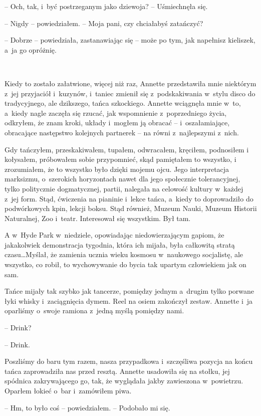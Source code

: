 \documentclass[oneside,polish,11pt,sfheadings]{mwbk}
\begin{document}
-- Och, tak, i~być postrzeganym jako dziewoja? -- Uśmiechnęła się.

-- Nigdy -- powiedziałem. -- Moja pani, czy chciałabyś zatańczyć?

-- Dobrze -- powiedziała, zastanawiając się -- może po tym, jak napełnisz
kieliszek, a~ja go opróżnię.

~

Kiedy to zostało załatwione, więcej niż raz, Annette przedstawiła mnie
niektórym z~jej przyjaciół i~kuzynów, i~taniec zmienił się z~podskakiwania w~stylu disco do tradycyjnego, ale dzikszego, tańca
szkockiego. Annette wciągnęła mnie w~to, a~kiedy nagle zaczęła się
rzucać, jak wspomnienie z~poprzedniego życia, odkryłem, że znam kroki,
układy i~mogłem ją obracać -- i~oszałamiające, obracające następstwo
kolejnych partnerek -- na równi z~najlepszymi z~nich.

Gdy tańczyłem, przeskakiwałem, tupałem, odwracałem, kręciłem, podnosiłem
i kołysałem, próbowałem sobie przypomnieć, skąd pamiętałem to wszystko,
i zrozumiałem, że to wszystko było dzięki mojemu ojcu. Jego
interpretacja marksizmu, o~szerokich horyzontach nawet dla jego
społecznie tolerancyjnej, tylko politycznie dogmatycznej, partii,
nalegała na celowość kultury w~każdej z~jej form. Stąd, ćwiczenia na
pianinie i~lekce tańca, a~kiedy to doprowadziło do podwórkowych kpin,
lekcji boksu. Stąd również, Muzeum Nauki, Muzeum Historii Naturalnej,
Zoo i~teatr. Interesował się wszystkim. Był tam.

A w~Hyde Park w~niedziele, opowiadając niedowierzającym gapiom, że
jakakolwiek demonstracja tygodnia, która ich mijała, była całkowitą
stratą czasu\ldots Myślał, że zamienia ucznia wieku kosmosu w~naukowego
socjalistę, ale wszystko, co robił, to wychowywanie do bycia tak upartym
człowiekiem jak on sam.

Tańce mijały tak szybko jak tancerze, pomiędzy jednym a~drugim tylko
porwane łyki whisky i~zaciągnięcia dymem. Reel na osiem zakończył
zestaw. Annette i~ja oparliśmy o~swoje ramiona z~jedną myślą pomiędzy
nami. 

-- Drink?

-- Drink.

Poszliśmy do baru tym razem, nasza przypadkowa i~szczęśliwa pozycja na
końcu tańca zaprowadziła nas przed resztą. Annette usadowiła się na
stołku, jej spódnica zakrywającego go, tak, że wyglądała jakby
zawieszona w~powietrzu. Oparłem łokieć o~bar i~zamówiłem piwa.

-- Hm, to było coś -- powiedziałem. -- Podobało mi się.
\end{document}
